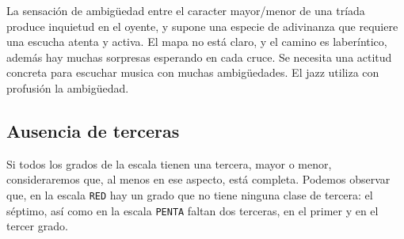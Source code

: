 \documentclass[]{article}
\begin{document}
La sensación de ambigüedad entre el caracter mayor/menor de una tríada produce inquietud en el oyente, y supone una especie de adivinanza que requiere una escucha atenta y activa. El mapa no está claro, y el camino es laberíntico, además hay muchas sorpresas esperando en cada cruce. Se necesita una actitud concreta para escuchar musica con muchas ambigüedades. El jazz utiliza con profusión la ambigüedad.

\subsection{Ausencia de terceras}

Si todos los grados de la escala tienen una tercera, mayor o menor, consideraremos que, al menos en ese aspecto, está completa. Podemos observar que, en la escala \texttt{RED} hay un grado que no tiene ninguna clase de tercera: el séptimo, así como en la escala \texttt{PENTA} faltan dos terceras, en el primer y en el tercer grado.
\end{document}
